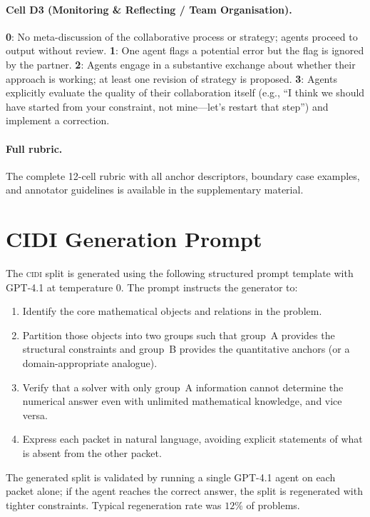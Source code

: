 \documentclass{article}
\newcommand{\CIDI}{\textsc{cidi}}
\begin{document}
\paragraph{Cell D3 (Monitoring \& Reflecting / Team Organisation).}
\textbf{0}: No meta-discussion of the collaborative process or
strategy; agents proceed to output without review. \textbf{1}: One
agent flags a potential error but the flag is ignored by the partner.
\textbf{2}: Agents engage in a substantive exchange about whether
their approach is working; at least one revision of strategy is
proposed. \textbf{3}: Agents explicitly evaluate the quality of their
collaboration itself (e.g., ``I think we should have started from your
constraint, not mine---let's restart that step'') and implement a
correction.

\paragraph{Full rubric.} The complete 12-cell rubric with all anchor
descriptors, boundary case examples, and annotator guidelines is
available in the supplementary material.

\section{CIDI Generation Prompt}
\label{app:cidi_prompt}

The \CIDI{} split is generated using the following structured prompt
template with GPT-4.1 at temperature 0. The prompt instructs the
generator to:
\begin{enumerate}
  \item Identify the core mathematical objects and relations in the
  problem.
  \item Partition those objects into two groups such that group~A
  provides the structural constraints and group~B provides the
  quantitative anchors (or a domain-appropriate analogue).
  \item Verify that a solver with only group~A information cannot
  determine the numerical answer even with unlimited mathematical
  knowledge, and vice versa.
  \item Express each packet in natural language, avoiding explicit
  statements of what is absent from the other packet.
\end{enumerate}
The generated split is validated by running a single GPT-4.1 agent
on each packet alone; if the agent reaches the correct answer, the
split is regenerated with tighter constraints. Typical regeneration
rate was $12\%$ of problems.
\end{document}
